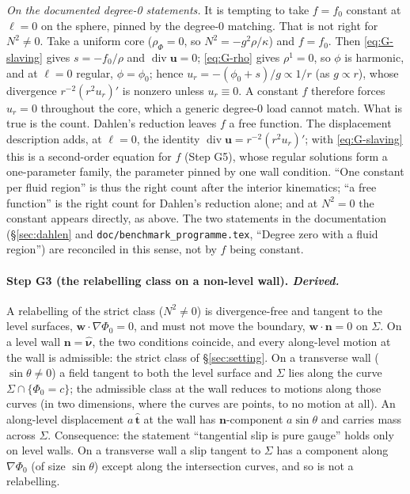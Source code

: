 \documentclass[11pt]{article}
\newcommand{\bu}{\mathbf{u}}
\newcommand{\bw}{\mathbf{w}}
\newcommand{\bn}{\mathbf{n}}
\newcommand{\Div}{\operatorname{div}}
\newcommand{\code}[1]{\texttt{#1}}
\newcommand{\nuh}{\hat{\boldsymbol{\nu}}}
\begin{document}
\emph{On the documented degree-0 statements.} It is tempting to take
$f = f_0$ constant at $\ell = 0$ on the sphere, pinned by the
degree-0 matching. That is not right for $N^2 \neq 0$. Take a uniform
core ($\rho_\Phi = 0$, so $N^2 = -g^2\rho/\kappa$) and $f = f_0$. Then
\eqref{eq:G-slaving} gives $s = -f_0/\rho$ and $\Div\bu = 0$;
\eqref{eq:G-rho} gives $\rho^1 = 0$, so $\phi$ is harmonic, and at
$\ell = 0$ regular, $\phi = \phi_0$; hence
$u_r = -(\phi_0 + s)/g \propto 1/r$ (as $g \propto r$), whose
divergence $r^{-2}(r^2u_r)'$ is nonzero unless $u_r \equiv 0$. A
constant $f$ therefore forces $u_r = 0$ throughout the core, which a
generic degree-0 load cannot match. What is true is the count. Dahlen's
reduction leaves $f$ a free function. The displacement description adds,
at $\ell = 0$, the identity $\Div\bu = r^{-2}(r^2 u_r)'$; with
\eqref{eq:G-slaving} this is a second-order equation for $f$ (Step G5),
whose regular solutions form a one-parameter family, the parameter
pinned by one wall condition. ``One constant per fluid region'' is thus
the right count after the interior kinematics; ``a free function'' is
the right count for Dahlen's reduction alone; and at $N^2 = 0$ the
constant appears directly, as above. The two statements in the
documentation (\S\ref{sec:dahlen} and \code{doc/benchmark\_programme.tex},
``Degree zero with a fluid region'') are reconciled in this sense, not
by $f$ being constant.

\paragraph{Step G3 (the relabelling class on a non-level wall).
\emph{Derived.}} A relabelling of the strict class ($N^2 \neq 0$) is
divergence-free and tangent to the level surfaces, $\bw\cdot\nabla\Phi_0
= 0$, and must not move the boundary, $\bw\cdot\bn = 0$ on $\Sigma$. On
a level wall $\bn = \nuh$, the two conditions coincide, and every
along-level motion at the wall is admissible: the strict class of
\S\ref{sec:setting}. On a transverse wall ($\sin\theta \neq 0$) a field
tangent to both the level surface and $\Sigma$ lies along the curve
$\Sigma\cap\{\Phi_0 = c\}$; the admissible class at the wall reduces to
motions along those curves (in two dimensions, where the curves are
points, to no motion at all). An along-level displacement $a\,\hat{\mathbf t}$
at the wall has $\bn$-component $a\sin\theta$ and carries mass across
$\Sigma$. Consequence: the statement ``tangential slip is pure gauge''
holds only on level walls. On a transverse wall a slip tangent to
$\Sigma$ has a component along $\nabla\Phi_0$ (of size $\sin\theta$)
except along the intersection curves, and so is not a relabelling.
\end{document}
